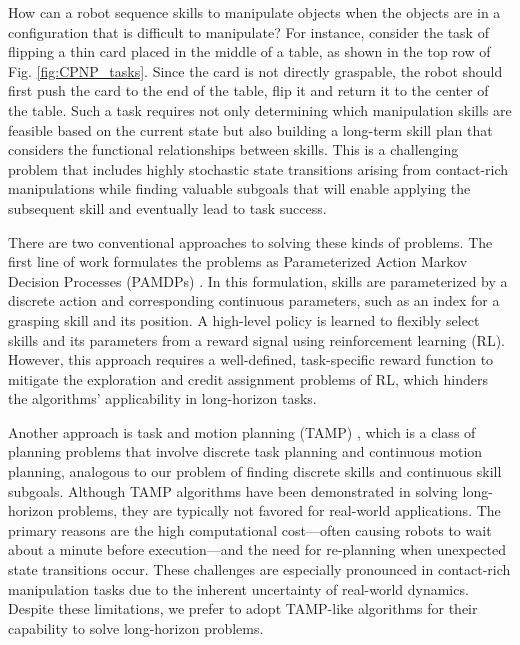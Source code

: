
How can a robot sequence skills to manipulate objects when the objects are in a configuration that is difficult to manipulate? For instance, consider the task of flipping a thin card placed in the middle of a table, as shown in the top row of Fig. \ref{fig:CPNP_tasks}. Since the card is not directly graspable, the robot should first push the card to the end of the table, flip it and return it to the center of the table. Such a task requires not only determining which manipulation skills are feasible based on the current state but also building a long-term skill plan that considers the functional relationships between skills. This is a challenging problem that includes highly stochastic state transitions arising from contact-rich manipulations while finding valuable subgoals that will enable applying the subsequent skill and eventually lead to task success.

There are two conventional approaches to solving these kinds of problems. The first line of work formulates the problems as Parameterized Action Markov Decision Processes (PAMDPs) \cite{hausknecht2015deep,jain2020generalization, jiang2024hacmanpp, masson2016reinforcement,  nasiriany2022augmenting, wei2018hierarchical, xiong2018parametrized, li2021hyar}. In this formulation, skills are parameterized by a discrete action and corresponding continuous parameters, such as an index for a grasping skill and its position. A high-level policy is learned to flexibly select skills and its parameters from a reward signal using reinforcement learning (RL).
However, this approach requires a well-defined, task-specific reward function to mitigate the exploration and credit assignment problems of RL, which hinders the algorithms' applicability in long-horizon tasks. 


Another approach is task and motion planning (TAMP) \cite{garrett2021integrated}, which is a class of planning problems that involve discrete task planning and continuous motion planning, analogous to our problem of finding discrete skills and continuous skill subgoals. Although TAMP algorithms have been demonstrated in solving long-horizon problems, they are typically not favored for real-world applications. The primary reasons are the high computational cost—often causing robots to wait about a minute before execution—and the need for re-planning when unexpected state transitions occur. These challenges are especially pronounced in contact-rich manipulation tasks due to the inherent uncertainty of real-world dynamics. Despite these limitations, we prefer to adopt TAMP-like algorithms for their capability to solve long-horizon problems.

